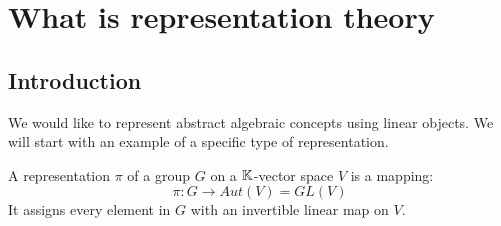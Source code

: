 \chapter*{What is representation theory}

\section{Introduction}


We would like to represent abstract algebraic concepts using linear objects. We will start with an example of a specific type of representation.
\begin{definition}
    A representation $\pi$ of a group $G$ on a $\mathbb{K}$-vector space $V$ is a mapping:
    \begin{equation*}
        \pi: G\to Aut(V)=GL(V)
    \end{equation*}
    It assigns every element in $G$ with an invertible linear map on $V$.
\end{definition}

